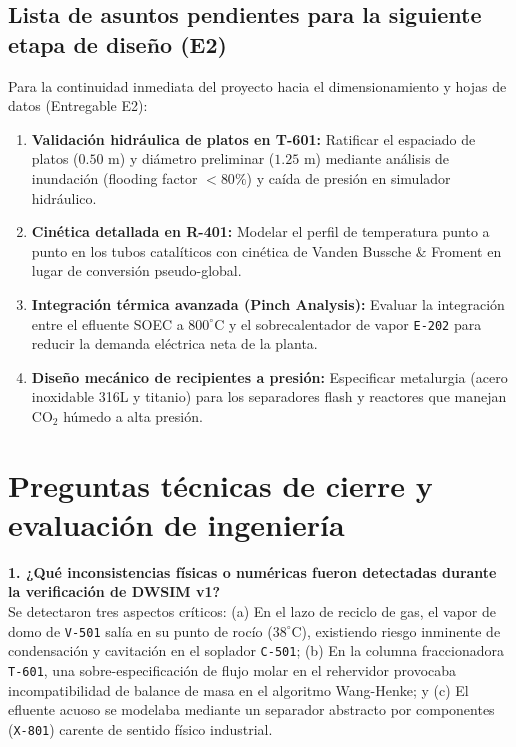 \documentclass[11pt,letterpaper]{article}
\begin{document}
\vspace{0.4cm}
\subsection{Lista de asuntos pendientes para la siguiente etapa de diseño (E2)}

Para la continuidad inmediata del proyecto hacia el dimensionamiento y hojas de datos (Entregable E2):
\begin{enumerate}
    \item \textbf{Validación hidráulica de platos en T-601:} Ratificar el espaciado de platos ($0.50\text{ m}$) y diámetro preliminar ($1.25\text{ m}$) mediante análisis de inundación (flooding factor $<80\%$) y caída de presión en simulador hidráulico.
    \item \textbf{Cinética detallada en R-401:} Modelar el perfil de temperatura punto a punto en los tubos catalíticos con cinética de Vanden Bussche \& Froment en lugar de conversión pseudo-global.
    \item \textbf{Integración térmica avanzada (Pinch Analysis):} Evaluar la integración entre el efluente SOEC a $800^\circ\text{C}$ y el sobrecalentador de vapor \texttt{E-202} para reducir la demanda eléctrica neta de la planta.
    \item \textbf{Diseño mecánico de recipientes a presión:} Especificar metalurgia (acero inoxidable 316L y titanio) para los separadores flash y reactores que manejan $\text{CO}_2$ húmedo a alta presión.
\end{enumerate}

\clearpage

\section{Preguntas técnicas de cierre y evaluación de ingeniería}

\textbf{1. ¿Qué inconsistencias físicas o numéricas fueron detectadas durante la verificación de DWSIM v1?}\\
Se detectaron tres aspectos críticos: (a) En el lazo de reciclo de gas, el vapor de domo de \texttt{V-501} salía en su punto de rocío ($38^\circ\text{C}$), existiendo riesgo inminente de condensación y cavitación en el soplador \texttt{C-501}; (b) En la columna fraccionadora \texttt{T-601}, una sobre-especificación de flujo molar en el rehervidor provocaba incompatibilidad de balance de masa en el algoritmo Wang-Henke; y (c) El efluente acuoso se modelaba mediante un separador abstracto por componentes (\texttt{X-801}) carente de sentido físico industrial.
\end{document}
